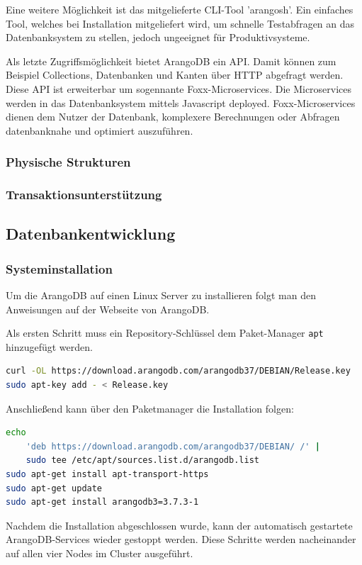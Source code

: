 Eine weitere Möglichkeit ist das mitgelieferte \ac{CLI}-Tool 'arangosh'. Ein einfaches Tool, welches bei Installation mitgeliefert wird, um schnelle Testabfragen an das Datenbanksystem zu stellen, jedoch ungeeignet für Produktivsysteme. \cite{ADB_arangosh}

Als letzte Zugriffsmöglichkeit bietet ArangoDB ein \ac{API}. Damit können zum Beispiel Collections, Datenbanken und Kanten über \ac{HTTP} abgefragt werden. \cite{ADB_api} Diese \ac{API} ist erweiterbar um sogennante Foxx-Microservices. Die Microservices werden in das Datenbanksystem mittels Javascript deployed. Foxx-Microservices dienen dem Nutzer der Datenbank, komplexere Berechnungen oder Abfragen datenbanknahe und optimiert auszuführen. \cite{ADB_foxx}

\subsubsection{Physische Strukturen}
\subsubsection{Transaktionsunterstützung}

\subsection{Datenbankentwicklung}
\subsubsection{Systeminstallation}
Um die ArangoDB auf einen Linux Server zu installieren folgt man den Anweisungen auf der Webseite von ArangoDB.

Als ersten Schritt muss ein Repository-Schlüssel dem Paket-Manager \texttt{apt} hinzugefügt werden.
\begin{lstlisting}[language=bash]
curl -OL https://download.arangodb.com/arangodb37/DEBIAN/Release.key
sudo apt-key add - < Release.key
\end{lstlisting}
Anschließend kann über den Paketmanager die Installation folgen:
\begin{lstlisting}[language=bash]
echo 
	'deb https://download.arangodb.com/arangodb37/DEBIAN/ /' | 
	sudo tee /etc/apt/sources.list.d/arangodb.list
sudo apt-get install apt-transport-https
sudo apt-get update
sudo apt-get install arangodb3=3.7.3-1
\end{lstlisting}
Nachdem die Installation abgeschlossen wurde, kann der automatisch gestartete ArangoDB-Services wieder gestoppt werden. Diese Schritte werden nacheinander auf allen vier Nodes im Cluster ausgeführt. \cite{ADB_install}

